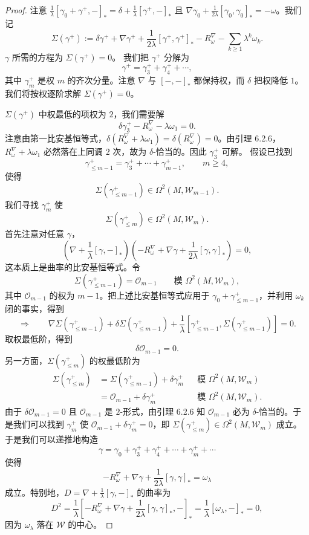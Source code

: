 \begin{proof}
  注意 $\frac1\lambda[\gamma_0+\gamma^+,-]_*=\delta+\frac1\lambda[\gamma^+,-]_*$
  且 $\nabla\gamma_0+\frac1{2\lambda}[\gamma_0,\gamma_0]_*=-\omega$。我们记
  \[
  \Sigma(\gamma^+):=\delta\gamma^++\nabla\gamma^+
  +\frac{1}{2\lambda}[\gamma^+,\gamma^+]_*
  -R^\nabla_\omega-\sum_{k\ge1}\lambda^k\omega_k.
  \]
  $\gamma$ 所需的方程为 $\Sigma(\gamma^+)=0$。
  我们把 $\gamma^+$ 分解为
  \[
  \gamma^+=\gamma^+_3+\gamma^+_4+\cdots,
  \]
  其中 $\gamma^+_m$ 是权 $m$ 的齐次分量。注意 $\nabla$ 与 $[-, -]_*$ 都保持权，而
  $\delta$ 把权降低 $1$。我们将按权逐阶求解 $\Sigma(\gamma^+)=0$。

  $\Sigma(\gamma^+)$ 中权最低的项权为 $2$，我们需要解
  \[
  \delta\gamma^+_3-R^\nabla_\omega-\lambda\omega_1=0.
  \]
  注意由第一比安基恒等式，$\delta(R^\nabla_\omega+\lambda\omega_1)
  =\delta(R^\nabla_\omega)=0$。由引理 6.2.6，$R^\nabla_\omega+\lambda\omega_1$
  必然落在上同调 $2$ 次，故为 $\delta$-恰当的。因此 $\gamma^+_3$ 可解。
  假设已找到
  \[
  \gamma^+_{\le m-1}=\gamma^+_3+\cdots+\gamma^+_{m-1},\qquad m\ge4,
  \]
  使得
  \[
  \Sigma(\gamma^+_{\le m-1})\in\Omega^2(M,\mathcal{W}_{m-1}).
  \]
  我们寻找 $\gamma^+_m$ 使
  \[
  \Sigma(\gamma^+_{\le m})\in\Omega^2(M,\mathcal{W}_m).
  \]
  首先注意对任意 $\gamma$，
  \[
  \left(\nabla+\frac{1}{\lambda}[\gamma,-]_*\right)
  \left(-R^\nabla_\omega+\nabla\gamma+\frac{1}{2\lambda}[\gamma,\gamma]_*\right)=0,
  \]
  这本质上是曲率的比安基恒等式。令
  \[
  \Sigma(\gamma^+_{\le m-1})=\mathcal{O}_{m-1}
  \qquad\text{模 } \Omega^2(M,\mathcal{W}_m),
  \]
  其中 $\mathcal{O}_{m-1}$ 的权为 $m-1$。把上述比安基恒等式应用于
  $\gamma_0+\gamma^+_{\le m-1}$，并利用 $\omega_k$ 闭的事实，得到
  \[
  \Longrightarrow\qquad
  \nabla\Sigma(\gamma^+_{\le m-1})+\delta\Sigma(\gamma^+_{\le m-1})
  +\frac{1}{\lambda}\left[\gamma^+_{\le m-1},
  \Sigma(\gamma^+_{\le m-1})\right]=0.
  \]
  取权最低阶，得到
  \[
  \delta\mathcal{O}_{m-1}=0.
  \]
  另一方面，$\Sigma(\gamma^+_{\le m})$ 的权最低阶为
  \begin{align*}
  \Sigma(\gamma^+_{\le m})
  &=\Sigma(\gamma^+_{\le m-1})+\delta\gamma^+_m
  &&\text{模 } \Omega^2(M,\mathcal{W}_m)\\
  &=\mathcal{O}_{m-1}+\delta\gamma^+_m
  &&\text{模 } \Omega^2(M,\mathcal{W}_m).
  \end{align*}
  由于 $\delta\mathcal{O}_{m-1}=0$ 且 $\mathcal{O}_{m-1}$ 是 $2$-形式，由引理
  6.2.6 知 $\mathcal{O}_{m-1}$ 必为 $\delta$-恰当的。于是我们可以找到
  $\gamma^+_m$ 使 $\mathcal{O}_{m-1}+\delta\gamma^+_m=0$，即
  $\Sigma(\gamma^+_{\le m})\in\Omega^2(M,\mathcal{W}_m)$ 成立。
  于是我们可以递推地构造
  \[
  \gamma=\gamma_0+\gamma^+_3+\gamma^+_4+\cdots+\gamma^+_m+\cdots
  \]
  使得
  \[
  -R^\nabla_\omega+\nabla\gamma+\frac{1}{2\lambda}[\gamma,\gamma]_*
  =\omega_\lambda
  \]
  成立。特别地，$D=\nabla+\frac1\lambda[\gamma,-]_*$ 的曲率为
  \[
  D^2=\frac{1}{\lambda}\left[-R^\nabla_\omega+\nabla\gamma
  +\frac{1}{2\lambda}[\gamma,\gamma]_*,-\right]_*
  =\frac{1}{\lambda}[\omega_\lambda,-]_*=0,
  \]
  因为 $\omega_\lambda$ 落在 $\mathcal{W}$ 的中心。
\end{proof}

